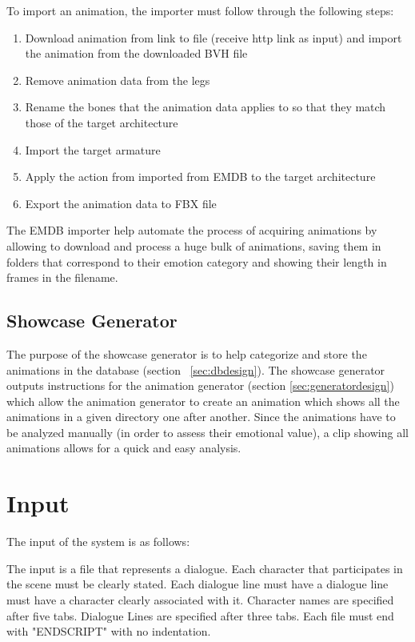 \medskip
\noindent To import an animation, the importer must follow through the following steps:
\begin{enumerate}
\item Download animation from link to file (receive http link as input) and import the animation from the downloaded BVH file
\item Remove animation data from the legs
\item Rename the bones that the animation data applies to so that they match those of the target architecture
\item Import the target armature
\item Apply the action from imported from EMDB to the target architecture
\item Export the animation data to FBX file
\end{enumerate}

The EMDB importer help automate the process of acquiring animations by allowing to download and process a huge bulk of animations, saving them in folders that correspond to their emotion category and showing their length in frames in the filename.

\subsection{Showcase Generator \label{sec:showcasegenerator}}
The purpose of the showcase generator is to help categorize and store the animations in the database (section ~\ref{sec:dbdesign}). The showcase generator outputs instructions for the animation generator (section \ref{sec:generatordesign}) which allow the animation generator to create an animation which shows all the animations in a given directory one after another. Since the animations have to be analyzed manually (in order to assess their emotional value), a clip showing all animations allows for a quick and easy analysis.


\section{Input}

The input of the system is as follows:

The input is a file that represents a dialogue. Each character that participates in the scene must be clearly stated. Each dialogue line must have a dialogue line must have a character clearly associated with it. Character names are specified after five tabs. Dialogue Lines are specified after three tabs. Each file must end with "ENDSCRIPT" with no indentation.

